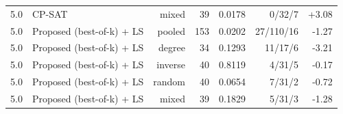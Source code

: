 \begin{table}[t]
\begin{tabular}{llrrrrr}
5.0 & CP-SAT & mixed & 39 & 0.0178 & 0/32/7 & +3.08 \\
5.0 & Proposed (best-of-k) + LS & pooled & 153 & 0.0202 & 27/110/16 & -1.27 \\
5.0 & Proposed (best-of-k) + LS & degree & 34 & 0.1293 & 11/17/6 & -3.21 \\
5.0 & Proposed (best-of-k) + LS & inverse & 40 & 0.8119 & 4/31/5 & -0.17 \\
5.0 & Proposed (best-of-k) + LS & random & 40 & 0.0654 & 7/31/2 & -0.72 \\
5.0 & Proposed (best-of-k) + LS & mixed & 39 & 0.1829 & 5/31/3 & -1.28 \\
\bottomrule
\end{tabular}
\end{table}
